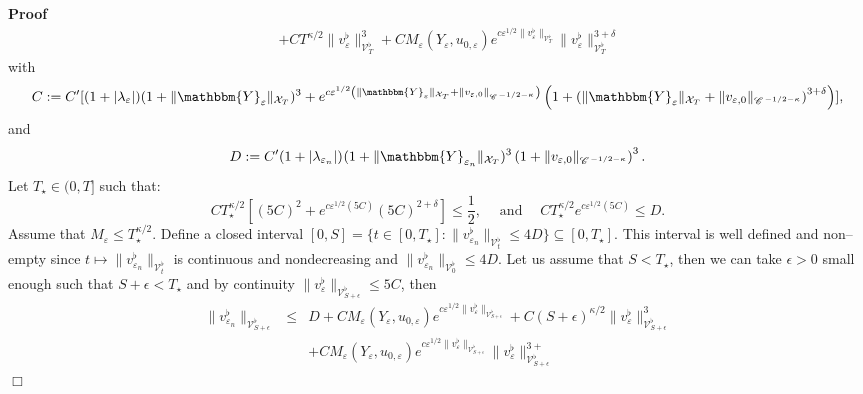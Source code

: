 \documentclass[a4paper,11pt]{article}
\newcommand{\assign}{:=}
\newcommand{\tmop}[1]{\ensuremath{\operatorname{#1}}}
\newenvironment{proof}{\noindent\textbf{Proof\ }}{\hspace*{\fill}$\Box$\medskip}
\newcommand{\CC}{\mathscr{C} \hspace{.1em}}
\begin{document}
\begin{proof}
\begin{eqnarray*}
    &  & + CT^{\kappa / 2} \| v^{\flat}_{\varepsilon}
    \|_{\mathcal{V}^{\flat}_T}^3 + CM_{\varepsilon} (Y_{\varepsilon}, u_{0,
    \varepsilon}) e^{c \varepsilon^{1 / 2} \| v^{\flat}_{\varepsilon}
    \|_{\mathcal{V}_T^{\flat}}} \| v^{\flat}_{\varepsilon}
    \|_{\mathcal{V}^{\flat}_T}^{3 + \delta}
  \end{eqnarray*}
  with
  \[ C \assign C' [(1 + | \lambda_{\varepsilon} |) (1 + \|
     \mathbbm{Y}_{\varepsilon} \|_{\mathcal{X}_T})^3 + e^{c \varepsilon^{1 /
     2} \left( \| \mathbbm{Y}_{\varepsilon} \|_{\mathcal{X}_T} + \|
     v_{\varepsilon, 0} \|_{\CC^{- 1 / 2 - \kappa}} \right)} \left( 1 + \left(
     \| \mathbbm{Y}_{\varepsilon} \|_{\mathcal{X}_T} + \| v_{\varepsilon, 0}
     \|_{\CC^{- 1 / 2 - \kappa}} \right)^{3 + \delta} \right)], \]
  and
  \[ D \assign C' (1 + | \lambda_{\varepsilon_n} |)_{}  (1 + \|
     \mathbbm{Y}_{\varepsilon_n} \|_{\mathcal{X}_T})^3 \left( 1 + \|
     v_{\varepsilon, 0} \|_{\CC^{- 1 / 2 - \kappa}} \right)^3 . \]
  Let $T_{\star} \in (0, T]$ such that:
  \[ CT_{\star}^{\kappa / 2} [(5 C)^2 + e^{c \varepsilon^{1 / 2} (5 C)} (5
     C)^{2 + \delta}] \leqslant \frac{1}{2}, \quad \tmop{and} \quad
     CT_{\star}^{\kappa / 2} e^{c \varepsilon^{1 / 2} (5 C)} \leqslant D. \]
  Assume that $M_{\varepsilon} \leqslant T_{\star}^{\kappa / 2}$. Define a
  closed interval $[0, S] = \{t \in [0, T_{\star}] : \|
  v^{\flat}_{\varepsilon_n} \|_{\mathcal{V}_t^{\flat}} \leqslant 4 D\}
  \subseteq [0, T_{\star}]$. This interval is well defined and non--empty
  since $t \mapsto \| v^{\flat}_{\varepsilon_n} \|_{\mathcal{V}_t^{\flat}}$ is
  continuous and nondecreasing and $\| v^{\flat}_{\varepsilon_n}
  \|_{\mathcal{V}_0^{\flat}} \leqslant 4 D$. Let us assume that $S <
  T_{\star}$, then we can take $\epsilon > 0$ small enough such that $S +
  \epsilon < T_{\star}$ and by continuity $\| v^{\flat}_{\varepsilon}
  \|_{\mathcal{V}_{S + \epsilon}^{\flat}} \leqslant 5 C$, then
  \begin{eqnarray*}
    \| v^{\flat}_{\varepsilon_n} \|_{\mathcal{V}_{S + \epsilon}^{\flat}} &
    \leqslant & D + CM_{\varepsilon} (Y_{\varepsilon}, u_{0, \varepsilon})
    e^{c \varepsilon^{1 / 2} \| v^{\flat}_{\varepsilon} \|_{\mathcal{V}_{S +
    \epsilon}^{\flat}}} + C (S + \epsilon)^{\kappa / 2} \|
    v^{\flat}_{\varepsilon} \|_{\mathcal{V}^{\flat}_{S + \epsilon}}^3 \\
    &  & +
    CM_{\varepsilon} (Y_{\varepsilon}, u_{0, \varepsilon}) e^{c \varepsilon^{1
    / 2} \| v^{\flat}_{\varepsilon} \|_{\mathcal{V}_{S + \epsilon}^{\flat}}}
    \| v^{\flat}_{\varepsilon} \|_{\mathcal{V}^{\flat}_{S + \epsilon}}^{3 +
}
\end{eqnarray*}
\end{proof}
\end{document}
